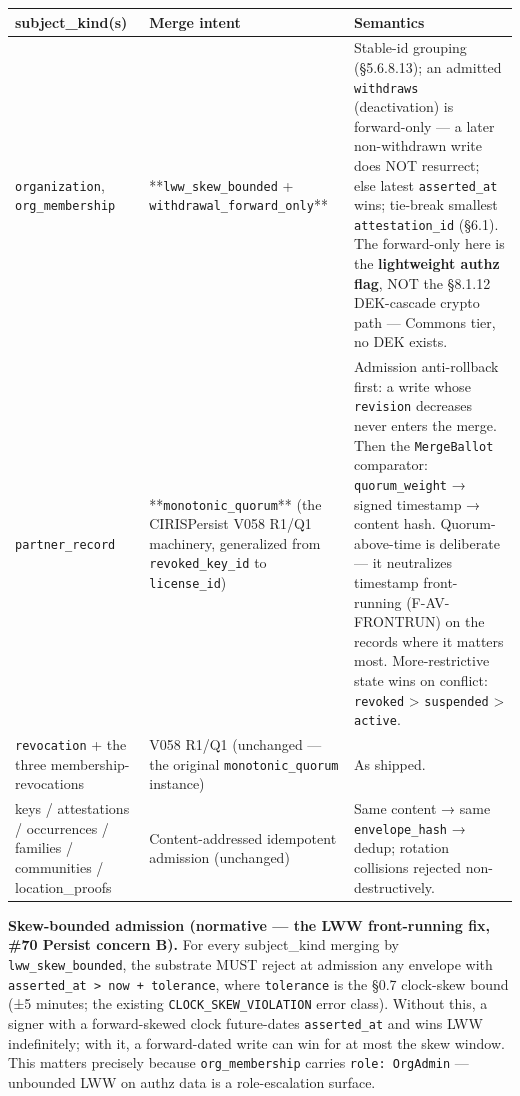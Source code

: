 \documentclass[11pt]{article}
\begin{document}
{\footnotesize
\begin{longtable}{|p{5.33cm}|p{5.33cm}|p{5.33cm}|}\hline
\textbf{subject\_kind(s)} & \textbf{Merge intent} & \textbf{Semantics} \\ \hline\endhead
\texttt{organization}, \texttt{org\_membership} & **\texttt{lww\_skew\_bounded} + \texttt{withdrawal\_forward\_only}** & Stable-id grouping (§5.6.8.13); an admitted \texttt{withdraws} (deactivation) is forward-only — a later non-withdrawn write does NOT resurrect; else latest \texttt{asserted\_at} wins; tie-break smallest \texttt{attestation\_id} (§6.1). The forward-only here is the \textbf{lightweight authz flag}, NOT the §8.1.12 DEK-cascade crypto path — Commons tier, no DEK exists. \\ \hline
\texttt{partner\_record} & **\texttt{monotonic\_quorum}** (the CIRISPersist V058 R1/Q1 machinery, generalized from \texttt{revoked\_key\_id} to \texttt{license\_id}) & Admission anti-rollback first: a write whose \texttt{revision} decreases never enters the merge. Then the \texttt{MergeBallot} comparator: \texttt{quorum\_weight} → signed timestamp → content hash. Quorum-above-time is deliberate — it neutralizes timestamp front-running (F-AV-FRONTRUN) on the records where it matters most. More-restrictive state wins on conflict: \texttt{revoked} > \texttt{suspended} > \texttt{active}. \\ \hline
\texttt{revocation} + the three membership-revocations & V058 R1/Q1 (unchanged — the original \texttt{monotonic\_quorum} instance) & As shipped. \\ \hline
keys / attestations / occurrences / families / communities / location\_proofs & Content-addressed idempotent admission (unchanged) & Same content → same \texttt{envelope\_hash} → dedup; rotation collisions rejected non-destructively. \\ \hline
\end{longtable}}


\textbf{Skew-bounded admission (normative — the LWW front-running fix, \#70 Persist concern B).} For every subject\_kind merging by \texttt{lww\_skew\_bounded}, the substrate MUST reject at admission any envelope with \texttt{asserted\_at > now + tolerance}, where \texttt{tolerance} is the §0.7 clock-skew bound (±5 minutes; the existing \texttt{CLOCK\_SKEW\_VIOLATION} error class). Without this, a signer with a forward-skewed clock future-dates \texttt{asserted\_at} and wins LWW indefinitely; with it, a forward-dated write can win for at most the skew window. This matters precisely because \texttt{org\_membership} carries \texttt{role: OrgAdmin} — unbounded LWW on authz data is a role-escalation surface.
\end{document}
